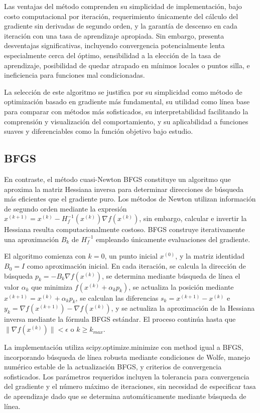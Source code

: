 \documentclass[12pt,a4paper]{article}
\begin{document}
Las ventajas del método comprenden su simplicidad de implementación, bajo costo computacional por iteración, requerimiento únicamente del cálculo del gradiente sin derivadas de segundo orden, y la garantía de descenso en cada iteración con una tasa de aprendizaje apropiada. Sin embargo, presenta desventajas significativas, incluyendo convergencia potencialmente lenta especialmente cerca del óptimo, sensibilidad a la elección de la tasa de aprendizaje, posibilidad de quedar atrapado en mínimos locales o puntos silla, e ineficiencia para funciones mal condicionadas.

La selección de este algoritmo se justifica por su simplicidad como método de optimización basado en gradiente más fundamental, su utilidad como línea base para comparar con métodos más sofisticados, su interpretabilidad facilitando la comprensión y visualización del comportamiento, y su aplicabilidad a funciones suaves y diferenciables como la función objetivo bajo estudio.

\subsection*{BFGS}

En contraste, el método cuasi-Newton BFGS constituye un algoritmo que aproxima la matriz Hessiana inversa para determinar direcciones de búsqueda más eficientes que el gradiente puro. Los métodos de Newton utilizan información de segundo orden mediante la expresión $x^{(k+1)} = x^{(k)} - H_f^{-1}(x^{(k)}) \nabla f(x^{(k)})$, sin embargo, calcular e invertir la Hessiana resulta computacionalmente costoso. BFGS construye iterativamente una aproximación $B_k$ de $H_f^{-1}$ empleando únicamente evaluaciones del gradiente.

El algoritmo comienza con $k = 0$, un punto inicial $x^{(0)}$, y la matriz identidad $B_0 = I$ como aproximación inicial. En cada iteración, se calcula la dirección de búsqueda $p_k = -B_k \nabla f(x^{(k)})$, se determina mediante búsqueda de línea el valor $\alpha_k$ que minimiza $f(x^{(k)} + \alpha_k p_k)$, se actualiza la posición mediante $x^{(k+1)} = x^{(k)} + \alpha_k p_k$, se calculan las diferencias $s_k = x^{(k+1)} - x^{(k)}$ e $y_k = \nabla f(x^{(k+1)}) - \nabla f(x^{(k)})$, y se actualiza la aproximación de la Hessiana inversa mediante la fórmula BFGS estándar. El proceso continúa hasta que $\|\nabla f(x^{(k)})\| < \epsilon$ o $k \geq k_{max}$.

La implementación utiliza scipy.optimize.minimize con method igual a BFGS, incorporando búsqueda de línea robusta mediante condiciones de Wolfe, manejo numérico estable de la actualización BFGS, y criterios de convergencia sofisticados. Los parámetros requeridos incluyen la tolerancia para convergencia del gradiente y el número máximo de iteraciones, sin necesidad de especificar tasa de aprendizaje dado que se determina automáticamente mediante búsqueda de línea.
\end{document}
